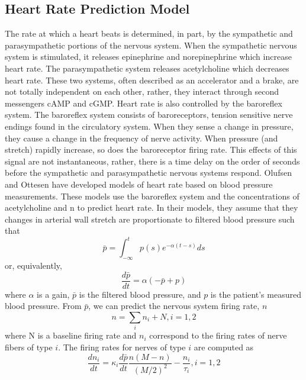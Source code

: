 \documentclass[12pt]{article}
\begin{document}
\subsection*{Heart Rate Prediction Model}
The rate at which a heart beats is determined, in part, by the sympathetic and parasympathetic portions of the nervous system. When the sympathetic nervous system is stimulated, it releases epinephrine and norepinephrine  which increase heart rate. The parasympathetic system releases acetylcholine which decreases heart rate.  These two systems, often described as an accelerator and a brake, are not totally independent on each other, rather, they interact through second messengers cAMP and cGMP. \citep{olshansky2008parasympathetic}
Heart rate is also controlled by the baroreflex system. The baroreflex system consists of baroreceptors, tension sensitive nerve endings found in the circulatory system. \citep{ottesen1997modelling} When they sense a change in pressure, they cause a change in the frequency of nerve activity. When pressure (and stretch) rapidly increase, so does the baroreceptor firing rate. \citep{negative1999reflexes} This effects of this signal are not instantaneous, rather, there is a time delay on the order of seconds before the sympathetic and parasympathetic nervous systems respond. \citep{ottesen1997modelling}
Olufsen and Ottesen have developed models of heart rate based on blood pressure measurements.\citep{olufsen2013practical} These models use the baroreflex system and the concentrations of acetylcholine and n to predict heart rate. In their models, they assume that they changes in arterial wall stretch are proportionate to filtered blood pressure such that
\begin{equation}
\bar p = \int_{-\infty}^{t} p(s)e^{-\alpha(t-s)}ds
\end{equation}
or, equivalently, 
\begin{equation}
\frac{d \bar p}{dt} = \alpha(-\bar p + p)
\end{equation}
where $\alpha$ is a gain, $\bar p$ is the filtered blood pressure, and $p$ is the patient's measured blood pressure. 
From $\bar p$, we can predict the nervous system firing rate, $n$
\begin{equation}
n = \sum_i n_i + N, i = 1,2
\end{equation}
where N is a baseline firing rate and $n_i$ correspond to the firing rates of nerve fibers of type $i$. The firing rates for nerves of type $i$ are computed as
\begin{equation}
\frac{dn_i}{dt} = \kappa_i \frac{d \bar p}{dt} \frac{n(M-n)}{(M/2)^2}-\frac{n_i}{\tau_i}, i = 1,2
\end{equation}
\end{document}
